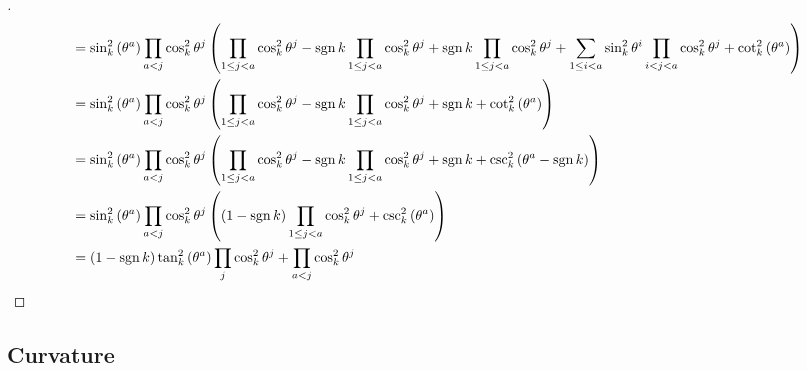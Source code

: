 \documentclass[stu, babel, american, biblatex, a4paper, leqno, draftall]{apa7}
\begin{document}
\begin{proof}[]
\begin{align*}
         & =
        \sin_k^2\left(\tensor{\theta}{^a}\right)
        \prod_{a<j}{\cos_k^2\tensor{\theta}{^j}}
        \left(
        \prod_{1\le j<a}{\cos_k^2\tensor{\theta}{^j}}
        -\sign{k}\prod_{1\le j<a}{\cos_k^2\tensor{\theta}{^j}}
        +\sign{k}\prod_{1\le j<a}{\cos_k^2\tensor{\theta}{^j}}
        + \sum_{1\le i<a}{
            \sin_k^2{\tensor{\theta}{^{i}}}\prod_{i<j<a}{\cos_k^2\tensor{\theta}{^j}}
        }
        +\cot_k^2\left(\tensor{\theta}{^a}\right)
        \right)                                                                                                            \\
         & =
        \sin_k^2\left(\tensor{\theta}{^a}\right)
        \prod_{a<j}{\cos_k^2\tensor{\theta}{^j}}
        \left(
        \prod_{1\le j<a}{\cos_k^2\tensor{\theta}{^j}}
        -\sign{k}\prod_{1\le j<a}{\cos_k^2\tensor{\theta}{^j}}
        +\sign{k}
        +\cot_k^2\left(\tensor{\theta}{^a}
        \right)
        \right)                                                                                                            \\
         & =
        \sin_k^2\left(\tensor{\theta}{^a}\right)
        \prod_{a<j}{\cos_k^2\tensor{\theta}{^j}}
        \left(
        \prod_{1\le j<a}{\cos_k^2\tensor{\theta}{^j}}
        -\sign{k}\prod_{1\le j<a}{\cos_k^2\tensor{\theta}{^j}}
        +\sign{k}
        +\csc_k^2\left(\tensor{\theta}{^a}
        -\sign{k}
        \right)
        \right)                                                                                                            \\
         & =
        \sin_k^2\left(\tensor{\theta}{^a}\right)
        \prod_{a<j}{\cos_k^2\tensor{\theta}{^j}}
        \left(
        \left(1-\sign{k}\right)\prod_{1\le j<a}{\cos_k^2\tensor{\theta}{^j}}
        +\csc_k^2\left(\tensor{\theta}{^a}
        \right)
        \right)                                                                                                            \\
         & =
        \left(1-\sign{k}\right)
        \tan_k^2\left(\tensor{\theta}{^a}\right)
        \prod_{j}{\cos_k^2\tensor{\theta}{^j}}
        +
        \prod_{a<j}{\cos_k^2\tensor{\theta}{^j}}
    \end{align*}
\end{proof}
\subsection{Curvature}
\end{document}
